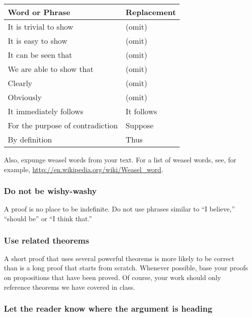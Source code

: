 \documentclass[12pt]{article}
\newcounter{ex}\setcounter{ex}{0}
\newcounter{se}\setcounter{se}{0}
\begin{document}
\begin{center}
\begin{tabular}{| l l |}
\hline  \textbf {Word or Phrase} &  \textbf {\textbf{Replace}ment} \\ 
\hline
It is trivial to show    & (omit) \\
It is easy to show     & (omit) \\   
It can be seen that    & (omit) \\
We are able to show that & (omit) \\
Clearly   & (omit) \\
Obviously  & (omit) \\
It immediately follows & It follows \\
For the purpose of contradiction &  Suppose \\
By definition                    & Thus \\
\hline
\end{tabular}
\end{center}
Also, expunge weasel words from your text. For a list of weasel words,  see, for example,  
\url{http://en.wikipedia.org/wiki/Weasel_word}.




 \subsubsection{  Do not be wishy-washy}  

A proof is no place to be indefinite.  Do not use  phrases similar 
to ``I believe,'' ``should be'' or ``I think that.''





 \subsubsection{  Use related theorems}  

A short proof that uses several powerful theorems is more likely to be
correct than is a long proof that starts from scratch.  Whenever
possible, base your proofs on propositions that have been proved.  Of
course, your work should only reference theorems we have covered in class.

 \subsubsection{  Let the reader know where the argument is heading} 
\end{document}
